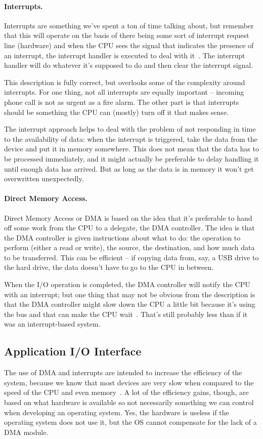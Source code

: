 \paragraph{Interrupts.}
Interrupts are something we've spent a ton of time talking about, but remember that this will operate on the basis of there being some sort of interrupt request line (hardware) and when the CPU sees the signal that indicates the presence of an interrupt, the interrupt handler is executed to deal with it~\cite{osc}. The interrupt handler will do whatever it's supposed to do and then clear the interrupt signal.

This description is fully correct, but overlooks some of the complexity around interrupts. For one thing, not all interrupts are equally important -- incoming phone call is not as urgent as a fire alarm. The other part is that interrupts should be something the CPU can (mostly) turn off it that makes sense. 

The interrupt approach helps to deal with the problem of not responding in time to the availability of data: when the interrupt is triggered, take the data from the device and put it in memory somewhere. This does not mean that the data has to be processed immediately, and it might actually be preferable to delay handling it until enough data has arrived. But as long as the data is in memory it won't get overwritten unexpectedly. 

\paragraph{Direct Memory Access.} 
Direct Memory Access or DMA is based on the idea that it's preferable to hand off some work from the CPU to a delegate, the DMA controller. The idea is that the DMA controller is given instructions about what to do: the operation to perform (either a read or write), the source, the destination, and how much data to be transferred. This can be efficient -- if copying data from, say, a USB drive to the hard drive, the data doesn't have to go to the CPU in between.

When the I/O operation is completed, the DMA controller will notify the CPU with an interrupt; but one thing that may not be obvious from the description is that the DMA controller might slow down the CPU a little bit because it's using the bus and that can make the CPU wait~\cite{osc}. That's still probably less than if it was an interrupt-based system. 

\subsection*{Application I/O Interface}
The use of DMA and interrupts are intended to increase the efficiency of the system, because we know that most devices are very slow when compared to the speed of the CPU and even memory~\cite{osi}. A lot of the efficiency gains, though, are based on what hardware is available so not necessarily something we can control when developing an operating system. Yes, the hardware is useless if the operating system does not use it, but the OS cannot compensate for the lack of a DMA module.

